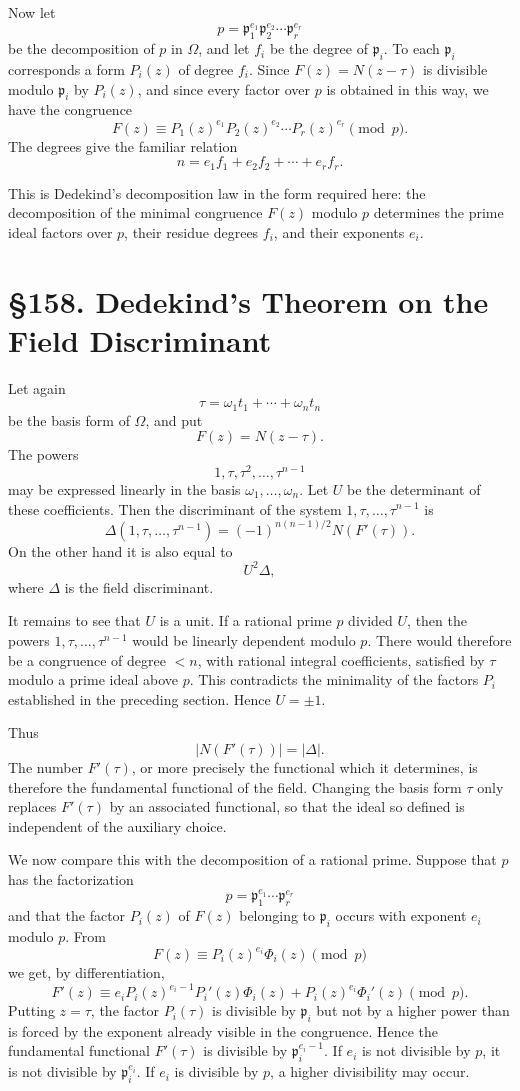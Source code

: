 \documentclass[12pt,a4paper]{article}
\newcommand{\webersection}[2]{\clearpage\section*{\S #1. #2}}
\newcommand{\p}{\mathfrak p}
\begin{document}
Now let
\[
  p=\p_1^{e_1}\p_2^{e_2}\cdots \p_r^{e_r}
\tag{4}
\]
be the decomposition of \(p\) in \(\Omega\), and let \(f_i\) be the degree of \(\p_i\).  To each \(\p_i\) corresponds a form \(P_i(z)\) of degree \(f_i\).  Since \(F(z)=N(z-\tau)\) is divisible modulo \(\p_i\) by \(P_i(z)\), and since every factor over \(p\) is obtained in this way, we have the congruence
\[
  F(z)\equiv P_1(z)^{e_1}P_2(z)^{e_2}\cdots P_r(z)^{e_r}\pmod p.
\tag{5}
\]
The degrees give the familiar relation
\[
  n=e_1f_1+e_2f_2+\cdots+e_rf_r.
\tag{6}
\]

This is Dedekind's decomposition law in the form required here: the decomposition of the minimal congruence \(F(z)\) modulo \(p\) determines the prime ideal factors over \(p\), their residue degrees \(f_i\), and their exponents \(e_i\).

\webersection{158}{Dedekind's Theorem on the Field Discriminant}

Let again
\[
  \tau=\omega_1t_1+\cdots+\omega_n t_n
\]
be the basis form of \(\Omega\), and put
\[
  F(z)=N(z-\tau).
\]
The powers
\[
  1,\tau,\tau^2,\ldots,\tau^{n-1}
\]
may be expressed linearly in the basis \(\omega_1,\ldots,\omega_n\).  Let \(U\) be the determinant of these coefficients.  Then the discriminant of the system \(1,\tau,\ldots,\tau^{n-1}\) is
\[
  \Delta(1,\tau,\ldots,\tau^{n-1})
     =(-1)^{n(n-1)/2}N(F'(\tau)).
\tag{1}
\]
On the other hand it is also equal to
\[
  U^2\Delta,
\tag{2}
\]
where \(\Delta\) is the field discriminant.

It remains to see that \(U\) is a unit.  If a rational prime \(p\) divided \(U\), then the powers \(1,\tau,\ldots,\tau^{n-1}\) would be linearly dependent modulo \(p\).  There would therefore be a congruence of degree \(<n\), with rational integral coefficients, satisfied by \(\tau\) modulo a prime ideal above \(p\).  This contradicts the minimality of the factors \(P_i\) established in the preceding section.  Hence \(U=\pm1\).

Thus
\[
  |N(F'(\tau))|=|\Delta|.
\tag{3}
\]
The number \(F'(\tau)\), or more precisely the functional which it determines, is therefore the fundamental functional of the field.  Changing the basis form \(\tau\) only replaces \(F'(\tau)\) by an associated functional, so that the ideal so defined is independent of the auxiliary choice.

We now compare this with the decomposition of a rational prime.  Suppose that \(p\) has the factorization
\[
  p=\p_1^{e_1}\cdots\p_r^{e_r}
\]
and that the factor \(P_i(z)\) of \(F(z)\) belonging to \(\p_i\) occurs with exponent \(e_i\) modulo \(p\).  From
\[
  F(z)\equiv P_i(z)^{e_i}\Phi_i(z)\pmod p
\]
we get, by differentiation,
\[
  F'(z)\equiv e_iP_i(z)^{e_i-1}P_i'(z)\Phi_i(z)
        +P_i(z)^{e_i}\Phi_i'(z)\pmod p.
\]
Putting \(z=\tau\), the factor \(P_i(\tau)\) is divisible by \(\p_i\) but not by a higher power than is forced by the exponent already visible in the congruence.  Hence the fundamental functional \(F'(\tau)\) is divisible by \(\p_i^{e_i-1}\).  If \(e_i\) is not divisible by \(p\), it is not divisible by \(\p_i^{e_i}\).  If \(e_i\) is divisible by \(p\), a higher divisibility may occur.
\end{document}
